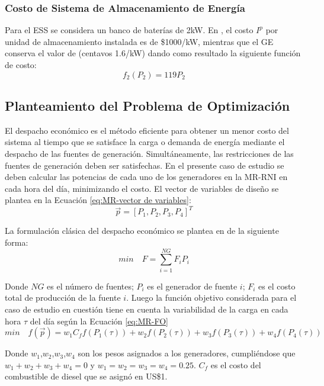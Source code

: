 \subsubsection{Costo de Sistema de Almacenamiento de Energía}
Para el ESS se considera un banco de baterías de 2kW. En \cite{zapata_zapata_control_2017}, el costo $I^p$ por unidad de almacenamiento instalada es de \$1000/kW, mientras que el GE conserva el valor de (centavos 1.6/kW) dando como resultado la siguiente función de costo:
\begin{equation}\label{eq:ESS}
f_2(P_2) = 119P_2
\end{equation}
\subsection{Planteamiento del Problema de Optimización}
El despacho económico es el método eficiente para obtener un menor costo del sistema al tiempo que se satisface la carga o demanda de energía mediante el despacho de las fuentes de generación. Simultáneamente, las restricciones de las fuentes de generación deben ser satisfechas. En el presente caso de estudio se deben calcular las potencias de cada uno de los generadores en la MR-RNI en cada hora del día, minimizando el costo. El vector de variables de diseño se plantea en la Ecuación  \ref{eq:MR-vector de variables}:
 \begin{equation}\label{eq:MR-vector de variables}
  \vec{p}=\left[ P_1,P_2,P_3,P_4 \right]^T
 \end{equation}


La formulación clásica del despacho económico se plantea en \cite{Ramabhotla_Economic_dispatch} de la siguiente forma:
 \begin{equation}
 min\quad  F=
 \sum_{i=1}^{NG}F_{i}P_{i} 
 \end{equation}

Donde $NG$ es el número de fuentes; $P_{i}$ es el generador de fuente $i$; $F_{i}$ es el costo total de producción de la fuente $i$. Luego la función objetivo considerada para el caso de estudio en cuestión tiene en cuenta la variabilidad de la carga en cada hora  $\tau$ del día según la Ecuación \ref{eq:MR-FO}
 \begin{equation}\label{eq:MR-FO}
min \quad f(\vec{p} ) = w_1C_f f(P_1(\tau)) + w_2f(P_2(\tau)) + w_3f(P_3(\tau))+ w_4f(P_4(\tau))
 \end{equation}
 
Donde $w_1$,$w_2$,$w_3$,$w_4$ son los pesos asignados a los generadores, cumpliéndose que  $w_1+ w_2+w_3+w_4=0$ y   $w_1=w_2=w_3=w_4=0.25$. $C_f$ es el costo del combustible de diesel que se asignó en US\$1.



